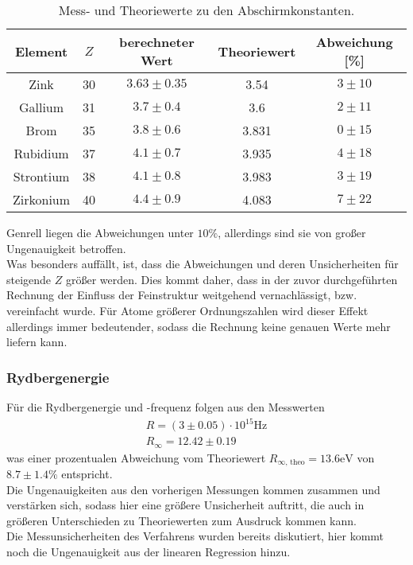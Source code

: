     \begin{table}
        \centering
        \caption{Mess- und Theoriewerte zu den Abschirmkonstanten.}
        \label{tab:abschirm}
        \begin{tabular}{c c c c c}
            \toprule 
            Element & $Z$ & berechneter Wert & Theoriewert & Abweichung [\%] \\
            \midrule
            Zink & 30 & $3.63 \pm 0.35$ & 3.54 & $3 \pm 10$ \\
            Gallium & 31 & $3.7 \pm 0.4$ & 3.6 & $2 \pm 11$ \\
            Brom & 35 & $3.8 \pm 0.6$ & 3.831 & $0 \pm 15$ \\
            Rubidium & 37 & $4.1 \pm 0.7$ & 3.935 & $4 \pm 18$ \\
            Strontium & 38 & $4.1 \pm 0.8$ & 3.983 & $3 \pm 19$ \\
            Zirkonium & 40 & $4.4 \pm 0.9$ & 4.083 & $7 \pm 22$ \\
            \bottomrule
        \end{tabular}
    \end{table}
    \FloatBarrier

    \noindent Genrell liegen die Abweichungen unter $10 \%$, allerdings sind sie von großer Ungenauigkeit betroffen.\\
    Was besonders auffällt, ist, dass die Abweichungen und deren Unsicherheiten für steigende $Z$ größer werden. Dies 
    kommt daher, dass in der zuvor durchgeführten Rechnung der Einfluss der Feinstruktur weitgehend vernachlässigt, bzw.
    vereinfacht wurde. Für Atome größerer Ordnungszahlen wird dieser Effekt allerdings immer bedeutender,
    sodass die Rechnung keine genauen Werte mehr liefern kann.\\

    \subsubsection{Rydbergenergie}
        Für die Rydbergenergie und -frequenz folgen aus den Messwerten
        \begin{align*}
            R = (3 \pm 0.05) \cdot 10^{15} \si{\Hz}\\
            R_{\infty} = 12.42 \pm 0.19
        \end{align*}
        was einer prozentualen Abweichung vom Theoriewert $R_{\infty \text{, theo}} = 13.6 \text{eV}$ von $8.7 \pm 1.4 \%$ entspricht. \\
        Die Ungenauigkeiten aus den vorherigen Messungen kommen zusammen und verstärken sich, sodass hier eine größere Unsicherheit auftritt, die auch in größeren Unterschieden zu
        Theoriewerten zum Ausdruck kommen kann.\\
        Die Messunsicherheiten des Verfahrens wurden bereits diskutiert, hier kommt noch die Ungenauigkeit aus der linearen Regression hinzu.